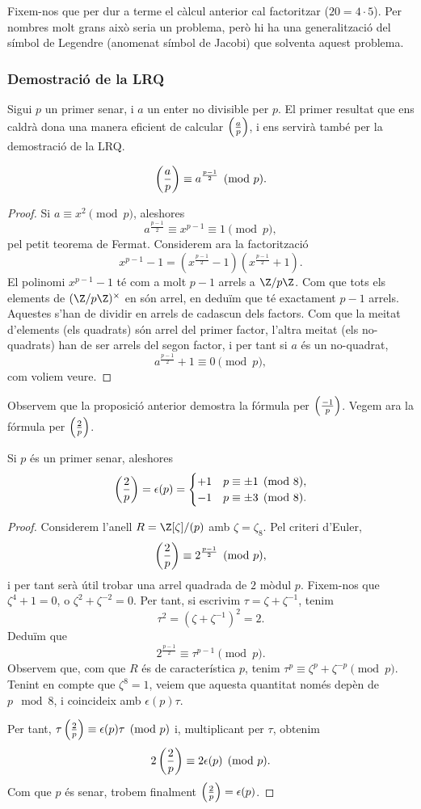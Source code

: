 Fixem-nos que per dur a terme el càlcul anterior cal factoritzar ($20=4\cdot 5$). Per nombres molt grans això seria un problema, però hi ha una generalització del símbol de Legendre (anomenat símbol de Jacobi) que solventa aquest problema.

\subsubsection{Demostració de la LRQ}

Sigui $p$ un primer senar, i $a$ un enter no divisible per $p$. El primer resultat que ens caldrà dona una manera eficient de calcular $\left(\frac{a}{p}\right)$, i ens servirà també per la demostració de la LRQ.
\begin{proposition}
 \[
 \left(\frac{a}{p}\right) \equiv a^{\frac{p-1}{2}}\pmod p.
 \]
\end{proposition}
\begin{proof}
Si $a\equiv x^2\pmod p$, aleshores
\[
a^{\frac{p-1}{2}} \equiv x^{p-1}\equiv 1\pmod p,
\]
pel petit teorema de Fermat. Considerem ara la factorització
\[
x^{p-1}-1 = (x^{\frac{p-1}{2}}-1)(x^{\frac{p-1}{2}}+1).
\]
El polinomi $x^{p-1}-1$ té com a molt $p-1$ arrels a $\Z/p\Z$. Com que tots els elements de $(\Z/p\Z)^\times$ en són arrel, en deduïm que té exactament $p-1$ arrels. Aquestes s'han de dividir en arrels de cadascun dels factors. Com que la meitat d'elements (els quadrats) són arrel del primer factor, l'altra meitat (els no-quadrats) han de ser arrels del segon factor, i per tant si $a$ és un no-quadrat,
\[
a^{\frac{p-1}{2}}+1\equiv0\pmod p,
\]
com voliem veure.
\end{proof}

Observem que la proposició anterior demostra la fórmula per $\left(\frac{-1}{p}\right)$. Vegem ara la fórmula per $\left(\frac{2}{p}\right)$.

\begin{proposition}
Si $p$ és un primer senar, aleshores
\[
\left(\frac{2}{p}\right)=\epsilon(p)=\begin{cases}
+1&p\equiv \pm 1\pmod{8},\\
-1&p\equiv \pm 3 \pmod{8}.
\end{cases}
\]
\end{proposition}
\begin{proof}
Considerem l'anell $R=\Z[\zeta]/(p)$ amb $\zeta=\zeta_8$. Pel criteri d'Euler,
\[
\left(\frac{2}{p}\right)\equiv 2^{\frac{p-1}{2}}\pmod p,
\]
i per tant serà útil trobar una arrel quadrada de $2$ mòdul $p$. Fixem-nos que $\zeta^4+1=0$, o $\zeta^2+\zeta^{-2}=0$. Per tant, si escrivim $\tau=\zeta+\zeta^{-1}$, tenim
\[
\tau^2 = (\zeta+\zeta^{-1})^2= 2.
\]
Deduïm que
\[
2^{\frac{p-1}{2}}\equiv \tau^{p-1}\pmod p.
\]
Observem que, com que $R$ és de característica $p$, tenim $\tau^p\equiv \zeta^p+\zeta^{-p}\pmod p$. Tenint en compte que $\zeta^8=1$, veiem que aquesta quantitat només depèn de $p\mod 8$, i coincideix amb $\epsilon(p)\tau$.

Per tant, $\tau \left(\frac{2}{p}\right) \equiv \epsilon(p) \tau \pmod p$ i, multiplicant per $\tau$, obtenim
\[
2\left(\frac{2}{p}\right)\equiv 2\epsilon(p)\pmod p.
\]
Com que $p$ és senar, trobem finalment $\left(\frac{2}{p}\right)=\epsilon(p)$.
\end{proof}


